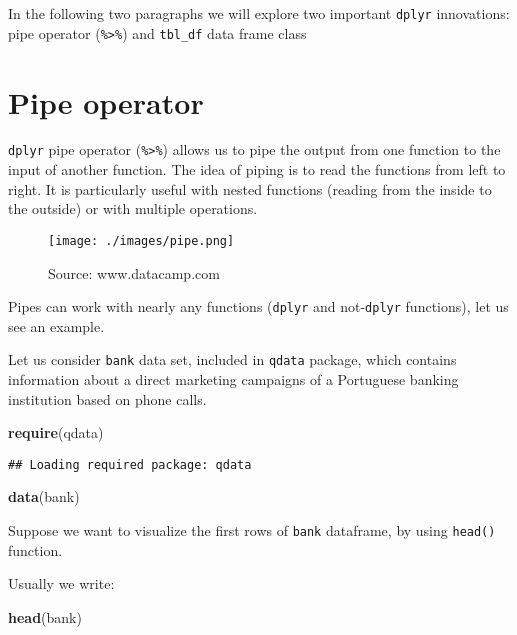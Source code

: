 \documentclass[]{book}
\newenvironment{Shaded}{\begin{snugshade}}{\end{snugshade}}
\newcommand{\KeywordTok}[1]{\textcolor[rgb]{0.13,0.29,0.53}{\textbf{{#1}}}}
\newcommand{\NormalTok}[1]{{#1}}
\begin{document}
In the following two paragraphs we will explore two important
\texttt{dplyr} innovations: pipe operator (\texttt{\%\textgreater{}\%})
and \texttt{tbl\_df} data frame class

\section{Pipe operator}\label{pipe-operator}

\texttt{dplyr} pipe operator (\texttt{\%\textgreater{}\%}) allows us to
pipe the output from one function to the input of another function. The
idea of piping is to read the functions from left to right. It is
particularly useful with nested functions (reading from the inside to
the outside) or with multiple operations.

\begin{figure}[htbp]
\centering
\texttt{[image: ./images/pipe.png]}
\caption{Source: www.datacamp.com}
\end{figure}

Pipes can work with nearly any functions (\texttt{dplyr} and
not-\texttt{dplyr} functions), let us see an example.

Let us consider \texttt{bank} data set, included in \texttt{qdata}
package, which contains information about a direct marketing campaigns
of a Portuguese banking institution based on phone calls.

\begin{Shaded}
\begin{Highlighting}[]
\KeywordTok{require}\NormalTok{(qdata)}
\end{Highlighting}
\end{Shaded}

\begin{verbatim}
## Loading required package: qdata
\end{verbatim}

\begin{Shaded}
\begin{Highlighting}[]
\KeywordTok{data}\NormalTok{(bank) }
\end{Highlighting}
\end{Shaded}

Suppose we want to visualize the first rows of \texttt{bank} dataframe,
by using \texttt{head()} function.

Usually we write:

\begin{Shaded}
\begin{Highlighting}[]
\KeywordTok{head}\NormalTok{(bank)}
\end{Highlighting}
\end{Shaded}
\end{document}
